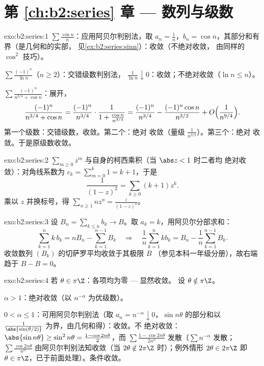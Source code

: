 \section*{第 \ref{ch:b2:series} 章 --- 数列与级数}

\begin{solution}{exo:b2:series:1}
$\sum\frac{\cos n}{n}$：应用阿贝尔判别法，取 $a_n = \frac1n$，$b_n =
\cos n$，其部分和有界（是几何和的实部，
见\cref{ex:b2:series:sinn}）：收敛（不绝对收敛，
由同样的 $\cos^2$ 技巧）。

$\sum \frac{(-1)^n}{\ln n}$（$n \geq 2$）：交错级数判别法，
$\frac{1}{\ln n} \downarrow 0$：收敛；不绝对收敛（$\ln n
\leq n$）。

$\sum \frac{(-1)^n}{n^{3/4} + \cos n}$：展开，
\[
\frac{(-1)^n}{n^{3/4} + \cos n}
= \frac{(-1)^n}{n^{3/4}}\cdot
\frac{1}{1 + \frac{\cos n}{n^{3/4}}}
= \frac{(-1)^n}{n^{3/4}}
- \frac{(-1)^n\cos n}{n^{3/2}} + O\Bigl(\frac{1}{n^{9/4}}\Bigr).
\]
第一个级数：交错级数，收敛。第二个：绝对
收敛（量级 $\frac{1}{n^{3/2}}$）。第三个：绝对
收敛。于是原级数收敛。
\end{solution}

\begin{solution}{exo:b2:series:2}
$\sum_{m\geq0} z^m$ 与自身的柯西乘积（当 $\abs z < 1$ 时二者均
绝对收敛）：对角线系数为 $c_k =
\sum_{m=0}^{k} 1 = k + 1$，于是
\[
\frac{1}{(1-z)^2} = \sum_{k\geq0} (k+1)z^k .
\]
乘以 $z$ 并换标号，得 $\sum_{n \geq 1} n z^n =
\frac{z}{(1-z)^2}$。
\end{solution}

\begin{solution}{exo:b2:series:3}
设 $B_n = \sum_{k \leq n} b_k \to B$。取 $a_k = k$，用阿贝尔分部求和：
\[
\sum_{k=1}^{n} k\,b_k = n B_n - \sum_{k=1}^{n-1} B_k
\quad\Longrightarrow\quad
\frac1n \sum_{k=1}^{n} k b_k = B_n - \frac{1}{n}\sum_{k=1}^{n-1}
B_k .
\]
收敛数列 $(B_k)$ 的切萨罗平均收敛于其极限 $B$
（参见本科一年级分册），故右端趋于 $B - B = 0$。
\end{solution}

\begin{solution}{exo:b2:series:4}
若 $\theta \in \pi\Z$：各项均为零 --- 显然收敛。
设 $\theta \notin \pi\Z$。

$\alpha > 1$：绝对收敛（以 $n^{-\alpha}$ 为优级数）。

$0 < \alpha \leq 1$：可用阿贝尔判别法（取 $a_n = n^{-\alpha}
\downarrow 0$，$\sin n\theta$ 的部分和以
$\frac{1}{\abs{\sin(\theta/2)}}$ 为界，由几何和得）：收敛。不
绝对收敛：$\abs{\sin n\theta} \geq \sin^2 n\theta = \frac{1 -
\cos 2n\theta}{2}$，而 $\sum \frac{1 - \cos 2n\theta}{2n^\alpha}$
发散（$\sum n^{-\alpha}$ 发散；$\sum
\frac{\cos 2n\theta}{n^\alpha}$ 由阿贝尔判别法知收敛（当 $2\theta
\notin 2\pi\Z$ 时）；例外情形 $2\theta \in 2\pi\Z$ 即
$\theta \in \pi\Z$，已于前面处理）。条件收敛。
\end{solution}

